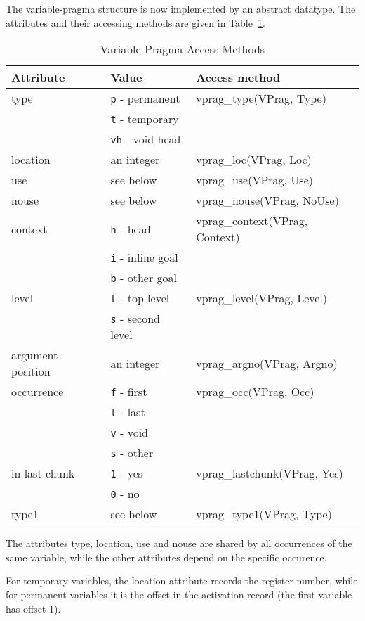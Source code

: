 The variable-pragma structure is now implemented by an abstract datatype.
The attributes and their accessing methods are given in Table~\ref{t:vprag}.

\begin{table}\centering
\begin{tabular}{|l|l|l|}
\hline
Attribute	& Value			& Access method			\\
\hline \hline
{\sf type}	& {\tt p} - permanent	& vprag\_type(VPrag, Type)	\\
		& {\tt t} - temporary	&				\\
		& {\tt vh} - void head	&				\\
{\sf location}	& an integer		& vprag\_loc(VPrag, Loc)	\\
{\sf use}	& see below		& vprag\_use(VPrag, Use)	\\
{\sf nouse}	& see below		& vprag\_nouse(VPrag, NoUse)	\\
\hline
{\sf context}	& {\tt h} - head	& vprag\_context(VPrag, Context)\\
		& {\tt i} - inline goal &				\\
		& {\tt b} - other goal	&				\\
{\sf level}	& {\tt t} - top	level	& vprag\_level(VPrag, Level)	\\
		& {\tt s} - second level&				\\
{\sf argument
     position}	& an integer		& vprag\_argno(VPrag, Argno)	\\
{\sf occurrence}& {\tt f} - first	& vprag\_occ(VPrag, Occ)	\\
		& {\tt l} - last	& 				\\
		& {\tt v} - void	& 				\\
		& {\tt s} - other	& 				\\
{\sf in last
     chunk}	& {\tt 1} - yes		& vprag\_lastchunk(VPrag, Yes)	\\
		& {\tt 0} - no		&				\\
\hline
{\sf type1}	& see below		& vprag\_type1(VPrag, Type)     \\
\hline
\end{tabular}
\caption{Variable Pragma Access Methods}
\label{t:vprag}
\end{table}

The attributes {\sf type, location, use} and {\sf nouse} are shared
by all occurrences of the same variable, while the other attributes
depend on the specific occurence.

For temporary variables, the {\sf location} attribute records the
register number, while for permanent variables it is the offset in
the activation record (the first variable has offset 1).

